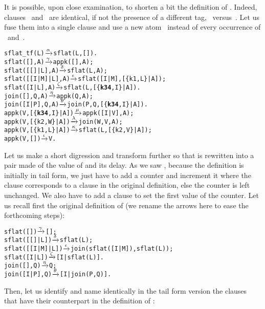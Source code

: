 It is possible, upon close examination, to shorten a bit the
definition of . Indeed, clauses
\clause{\nu}~and~\clause{\mu} are identical, if not the presence of a
different tag, ~versus~. Let us fuse them into
a single clause and use a new atom~ instead of every
occurrence of ~and~.\label{code:sflat_tf}
\begin{alltt}
sflat_tf(L)         \(\smashedrightarrow{\alpha}\) sflat(L,[]).
sflat(       [],A)  \(\smashedrightarrow{\gamma}\) appk([],A);
sflat(   [[]|L],A)  \(\smashedrightarrow{\delta}\) sflat(L,A);
sflat([[I|M]|L],A)  \(\smashedrightarrow{\epsilon}\) sflat([I|M],[\{k1,L\}|A]);
sflat(    [I|L],A)  \(\smashedrightarrow{\zeta}\) sflat(L,[\{\textbf{k34},I\}|A]).
join(   [],Q,A)     \(\smashedrightarrow{\eta}\) appk(Q,A);
join([I|P],Q,A)     \(\smashedrightarrow{\theta}\) join(P,Q,[\{\textbf{k34},I\}|A]).
appk(V,[\{\textbf{k34},I\}|A]) \(\smashedrightarrow{\mu}\) appk([I|V],A);
appk(V,[\{k2,W\}|A])  \(\smashedrightarrow{\lambda}\) join(W,V,A);
appk(V,[\{k1,L\}|A])  \(\smashedrightarrow{\kappa}\) sflat(L,[\{k2,V\}|A]);
appk(V,        [])  \(\smashedrightarrow{\iota}\) V.
\end{alltt}
Let us make a short digression and transform 
further so that  is rewritten into a pair
made of the value of  and its delay. As we saw
, because the definition is initially in tail
form, we just have to add a counter and increment it where the clause
corresponds to a clause in the original definition, else the counter
is left unchanged. We also have to add a clause to set the first value
of the counter. Let us recall first the original definition
of   (we rename the
arrows here to ease the forthcoming steps):
\begin{alltt}
sflat(       []) \(\smashedrightarrow{\gamma}\) [];
sflat(   [[]|L]) \(\smashedrightarrow{\delta}\) sflat(L);
sflat([[I|M]|L]) \(\smashedrightarrow{\epsilon}\) join(sflat([I|M]),sflat(L));
sflat(    [I|L]) \(\smashedrightarrow{\zeta}\) [I|sflat(L)].
join(   [],Q)    \(\smashedrightarrow{\eta}\) Q;
join([I|P],Q)    \(\smashedrightarrow{\theta}\) [I|join(P,Q)].
\end{alltt}
Then, let us identify and name identically in the tail form version
 the clauses that have their counterpart in the
definition of :
